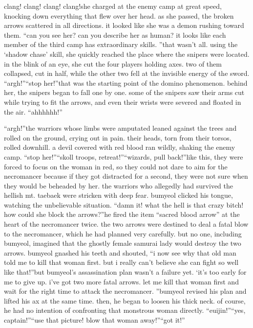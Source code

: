 clang! clang! clang! clang!she charged at the enemy camp at great speed, knocking down everything that flew over her head.
 as she passed, the broken arrows scattered in all directions.
it looked like she was a demon rushing toward them.
“can you see her? can you describe her as human? it looks like each member of the third camp has extraordinary skills.
”that wasn’t all.
 using the ‘shadow chase’ skill, she quickly reached the place where the snipers were located.
in the blink of an eye, she cut the four players holding axes.
 two of them collapsed, cut in half, while the other two fell at the invisible energy of the sword.
“argh!”“stop her!”that was the starting point of the domino phenomenon.
 behind her, the snipers began to fall one by one.
some of the snipers saw their arms cut while trying to fit the arrows, and even their wrists were severed and floated in the air.
“ahhhhhh!”

“argh!”the warriors whose limbs were amputated leaned against the trees and rolled on the ground, crying out in pain.
 their heads, torn from their torsos, rolled downhill.
a devil covered with red blood ran wildly, shaking the enemy camp.
“stop her!”“skoll troops, retreat!”“wizards, pull back!”like this, they were forced to focus on the woman in red, so they could not dare to aim for the necromancer because if they got distracted for a second, they were not sure when they would be beheaded by her.
 the warriors who allegedly had survived the hellish mt.
 taebaek were stricken with deep fear.
bumyeol clicked his tongue, watching the unbelievable situation.
“damn it! what the hell is that crazy bitch! how could she block the arrows?”he fired the item “sacred blood arrow” at the heart of the necromancer twice.
 the two arrows were destined to deal a fatal blow to the necromancer, which he had planned very carefully.
but no one, including bumyeol, imagined that the ghostly female samurai lady would destroy the two arrows.
bumyeol gnashed his teeth and shouted, “i now see why that old man told me to kill that woman first.
 but i really can’t believe she can fight so well like that!”but bumyeol’s assassination plan wasn’t a failure yet.
‘it’s too early for me to give up.
 i’ve got two more fatal arrows.
 let me kill that woman first and wait for the right time to attack the necromancer.
”bumyeol revised his plan and lifted his ax at the same time.
 then, he began to loosen his thick neck.
 of course, he had no intention of confronting that monstrous woman directly.
“euijin!”“yes, captain!”“use that picture! blow that woman away!”“got it!”

 
